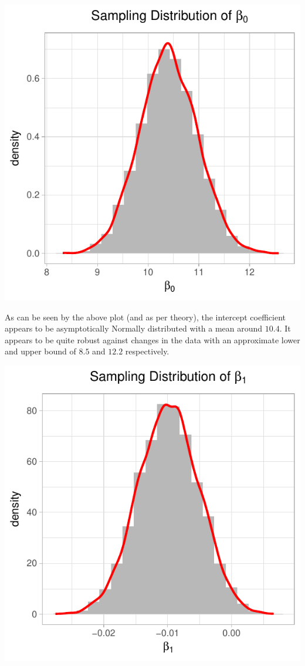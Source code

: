\documentclass[12pt,]{article}
\begin{document}
\begin{center}\includegraphics{report_files/figure-latex/plot_beta_0-1} \end{center}

As can be seen by the above plot (and as per theory), the intercept
coefficient appears to be asymptotically Normally distributed with a
mean around \(10.4\). It appears to be quite robust against changes in
the data with an approximate lower and upper bound of \(8.5\) and
\(12.2\) respectively.

\begin{center}\includegraphics{report_files/figure-latex/plot_beta_1-1} \end{center}
\end{document}
